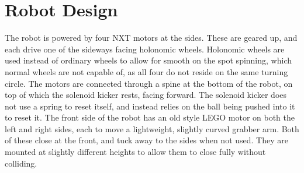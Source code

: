 \section{Robot Design}

The robot is powered by four NXT motors at the sides. These are geared up, and
each drive one of the sideways facing holonomic wheels. Holonomic wheels are
used instead of ordinary wheels to allow for smooth on the spot spinning, which
normal wheels are not capable of, as all four do not reside on the same turning
circle. The motors are connected through a spine at the bottom of the robot,
on top of which the solenoid kicker rests, facing forward. The solenoid kicker
does not use a spring to reset itself, and instead relies on the ball being
pushed into it to reset it. The front side of the robot has an old style LEGO
motor on both the left and right sides, each to move a lightweight, slightly
curved grabber arm. Both of these close at the front, and tuck away to the
sides when not used. They are mounted at slightly different heights to allow
them to close fully without colliding.

